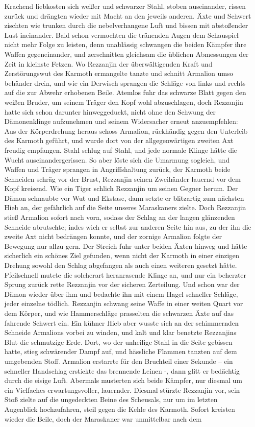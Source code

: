 Krachend liebkosten sich weißer und schwarzer Stahl, stoben auseinander, rissen zurück und drängten wieder mit Macht an den jeweils anderen. Äxte und Schwert zischten wie trunken durch die nebelverhangene Luft und bissen mit abstoßender Lust ineinander. Bald schon vermochten die tränenden Augen dem Schauspiel nicht mehr Folge zu leisten, denn unablässig schwangen die beiden Kämpfer ihre Waffen gegeneinander, und zerschnitten gleichsam die üblichen Abmessungen der Zeit in kleinste Fetzen. Wo Rezzanjin der überwältigenden Kraft und Zerstörungswut des Karmoth ermangelte tanzte und schnitt Armalion umso behänder drein, und wie ein Derwisch sprangen die Schläge von links und rechts auf die zur Abwehr erhobenen Beile. Atemlos fuhr das schwarze Blatt gegen den weißen Bruder, um seinem Träger den Kopf wohl abzuschlagen, doch Rezzanjin hatte sich schon darunter hinweggeduckt, nicht ohne den Schwung der Dämonenklinge aufzunehmen und seinem Widersacher erneut anzuempfehlen: Aus der Körperdrehung heraus schoss Armalion, rückhändig gegen den Unterleib des Karmoth geführt, und wurde dort von der allgegenwärtigen zweiten Axt freudig empfangen. Stahl schlug auf Stahl, und jede normale Klinge hätte die Wucht auseinandergerissen. So aber löste sich die Umarmung sogleich, und Waffen und Träger sprangen in Angriffshaltung zurück, der Karmoth beide Schneiden schräg vor der Brust, Rezzanjin seinen Zweihänder lauernd vor dem Kopf kreisend. Wie ein Tiger schlich Rezzanjin um seinen Gegner herum. Der Dämon schnaubte vor Wut und Ekstase, dann setzte er blitzartig zum nächsten Hieb an, der gefährlich auf die Seite unseres Maraskaners zielte. Doch Rezzanjin stieß Armalion sofort nach vorn, sodass der Schlag an der langen glänzenden Schneide abrutschte; indes wich er selbst zur anderen Seite hin aus, zu der ihn die zweite Axt nicht bedrängen konnte, und der zornige Armalion folgte der Bewegung nur allzu gern. Der Streich fuhr unter beiden Äxten hinweg und hätte sicherlich ein schönes Ziel gefunden, wenn nicht der Karmoth in einer einzigen Drehung sowohl den Schlag abgefangen als auch einen weiteren gesetzt hätte. Pfeilschnell mutete die solcherart heranrasende Klinge an, und nur ein beherzter Sprung zurück rette Rezzanjin vor der sicheren Zerteilung. Und schon war der Dämon wieder über ihm und bedachte ihn mit einem Hagel schneller Schläge, jeder einzelne tödlich. Rezzanjin schwang seine Waffe in einer weiten Quart vor dem Körper, und wie Hammerschläge prasselten die schwarzen Äxte auf das fahrende Schwert ein. Ein kühner Hieb aber wusste sich an der schimmernden Schneide Armalions vorbei zu winden, und kalt und klar benetzte Rezzanjins Blut die schmutzige Erde. Dort, wo der unheilige Stahl in die Seite gebissen hatte, stieg schwärender Dampf auf, und hässliche Flammen tanzten auf dem umgebenden Stoff. Armalion erstarrte für den Bruchteil einer Sekunde -- ein schneller Handschlag erstickte das brennende Leinen -, dann glitt er bedächtig durch die eisige Luft. Abermals musterten sich beide Kämpfer, nur diesmal um ein Vielfaches erwartungsvoller, lauernder. Diesmal stürzte Rezzanjin vor, sein Stoß zielte auf die ungedeckten Beine des Scheusals, nur um im letzten Augenblick hochzufahren, steil gegen die Kehle des Karmoth. Sofort kreisten wieder die Beile, doch der Maraskaner war unmittelbar nach dem 